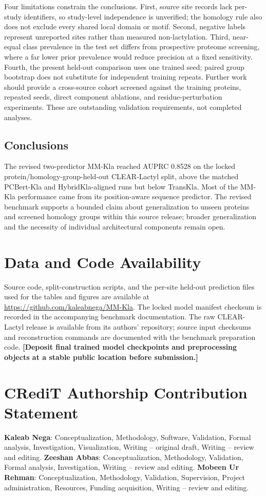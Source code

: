 \documentclass[twocolumn]{article}
\begin{document}
Four limitations constrain the conclusions. First, source site records
lack per-study identifiers, so study-level independence is unverified;
the homology rule also does not exclude every shared local domain or motif.
Second, negative labels represent unreported sites rather than measured
non-lactylation. Third, near-equal class prevalence in the test set differs
from prospective proteome screening, where a far lower prior prevalence
would reduce precision at a fixed sensitivity. Fourth, the present
held-out comparison uses one trained seed; paired group bootstrap does not
substitute for independent training repeats. Further work should provide
a cross-source cohort screened against the training proteins, repeated
seeds, direct component ablations, and residue-perturbation experiments.
These are outstanding validation requirements, not completed analyses.

\subsection{Conclusions}
The revised two-predictor MM-Kla reached AUPRC 0.8528 on the locked
protein/homology-group-held-out CLEAR-Lactyl split, above the matched
PCBert-Kla and HybridKla-aligned runs but below TransKla. Most of the
MM-Kla performance came from its position-aware sequence predictor.
The revised benchmark supports a bounded claim about generalization to
unseen proteins and screened homology groups within this source release;
broader generalization and the necessity of individual architectural
components remain open.

\section*{Data and Code Availability}
Source code, split-construction scripts, and the per-site held-out
prediction files used for the tables and figures are available at
\url{https://github.com/kaleabnega/MM-Kla}. The locked model manifest
checksum is recorded in the accompanying benchmark documentation.
The raw CLEAR-Lactyl release is available from its authors' repository;
source input checksums and reconstruction commands are documented with
the benchmark preparation code. \textbf{[Deposit final trained model
checkpoints and preprocessing objects at a stable public location before
submission.]}

\section*{CRediT Authorship Contribution Statement}
\textbf{Kaleab Nega}: Conceptualization, Methodology, Software, Validation,
Formal analysis, Investigation, Visualization, Writing -- original draft,
Writing -- review and editing.
\textbf{Zeeshan Abbas}: Conceptualization, Methodology, Validation, Formal
analysis, Investigation, Writing -- review and editing.
\textbf{Mobeen Ur Rehman}: Conceptualization, Methodology, Validation,
Supervision, Project administration, Resources, Funding acquisition,
Writing -- review and editing.
\end{document}
